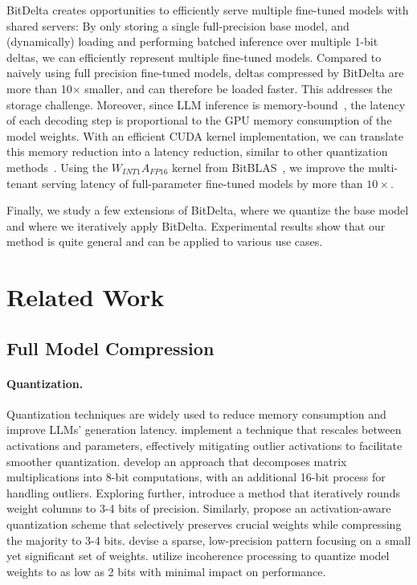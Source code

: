 \documentclass[numbers]{article}
\newcommand{\oursmethod}{BitDelta\xspace}
\begin{document}
\oursmethod creates opportunities to efficiently serve multiple fine-tuned models with shared servers: By only storing a single full-precision base model, and (dynamically) loading and performing batched inference over multiple 1-bit deltas, we can efficiently represent multiple fine-tuned models. Compared to naively using full precision fine-tuned models, deltas compressed by \oursmethod are more than 10$\times$ smaller, and can therefore be loaded faster. This addresses the storage challenge. Moreover, since LLM inference is memory-bound~\citep{leviathan2022fast,chen2023accelerating,cai2024medusa}, the latency of each decoding step is proportional to the GPU memory consumption of the model weights. With an efficient CUDA kernel implementation, we can translate this memory reduction into a latency reduction, similar to other quantization methods~\citep{frantar2022gptq,lin2023awq}. Using the $W_{INT1}A_{FP16}$ kernel from BitBLAS~\citep{ladder-osdi24}, we improve the multi-tenant serving latency of full-parameter fine-tuned models by more than $10\times$. 

Finally, we study a few extensions of \oursmethod, where we quantize the base model and where we iteratively apply \oursmethod. Experimental results show that our method is quite general and can be applied to various use cases.




\section{Related Work}
\label{sec:related}
\subsection{Full Model Compression}
\paragraph{Quantization.} Quantization techniques are widely used to reduce memory consumption and improve LLMs' generation latency. \citet{xiao2023smoothquant} implement a technique that rescales between activations and parameters, effectively mitigating outlier activations to facilitate smoother quantization. \citet{dettmers2022llm} develop an approach that decomposes matrix multiplications into 8-bit computations, with an additional 16-bit process for handling outliers. Exploring further, \citet{frantar2022gptq} introduce a method that iteratively rounds weight columns to 3-4 bits of precision. Similarly, \citet{lin2023awq} propose an activation-aware quantization scheme that selectively preserves crucial weights while compressing the majority to 3-4 bits. \citet{kim2023squeezellm} devise a sparse, low-precision pattern focusing on a small yet significant set of weights. \citet{chee2023quip} utilize incoherence processing to quantize model weights to as low as 2 bits with minimal impact on performance.
\end{document}
